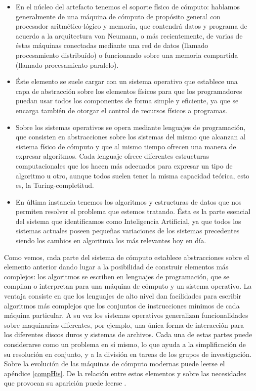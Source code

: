 \documentclass[12pt]{memoir}
\begin{document}
\begin{itemize}
	\item En el núcleo del artefacto tenemos el soporte físico de cómputo: hablamos generalmente de una máquina de cómputo de propósito general con procesador aritmético-lógico y memoria, que contendrá datos y programa de acuerdo a la arquitectura von Neumann, o más recientemente, de varias de éstas máquinas conectadas mediante una red de datos (llamado procesamiento distribuído) o funcionando sobre una memoria compartida (llamado procesamiento paralelo).
	\item Éste elemento se suele cargar con un sistema operativo que establece una capa de abstracción sobre los elementos físicos para que los programadores puedan usar todos los componentes de forma simple y eficiente, ya que se encarga también de otorgar el control de recursos físicos a programas.
	\item Sobre los sistemas operativos se opera mediante lenguajes de programación, que consisten en abstracciones sobre los sistemas del mismo que alcanzan al sistema físico de cómputo y que al mismo tiempo ofrecen una manera de expresar algoritmos. Cada lenguaje ofrece diferentes estructuras computacionales que los hacen más adecuados para expresar un tipo de algoritmo u otro, aunque todos suelen tener la misma capacidad teórica, esto es, la Turing-completitud.
	\item En última instancia tenemos los algoritmos y estructuras de datos que nos permiten resolver el problema que estemos tratando. Ésta es la parte esencial del sistema que identificamos como Inteligencia Artificial, ya que todos los sistemas actuales poseen pequeñas variaciones de los sistemas precedentes siendo los cambios en algoritmia los más relevantes hoy en día.
\end{itemize}

Como vemos, cada parte del sistema de cómputo establece abstracciones sobre el elemento anterior dando lugar a la posibilidad de construir elementos más complejos: los algoritmos se escriben en lenguajes de programación, que se compilan o interpretan para una máquina de cómputo y un sistema operativo. La ventaja consiste en que los lenguajes de alto nivel dan facilidades para escribir algoritmos más complejos que los conjuntos de instrucciones mínimos de cada máquina particular. A su vez los sistemas operativos generalizan funcionalidades sobre maquinarias diferentes, por ejemplo, una única forma de interacción para los diferentes discos duros y sistemas de archivos. Cada una de estas partes puede considerarse como un problema en sí mismo, lo que ayuda a la simplificación de su resolución en conjunto, y a la división en tareas de los grupos de investigación. Sobre la evolución de las máquinas de cómputo modernas puede leerse el apéndice \ref{compHis}. De la relación entre estos elementos y sobre las necesidades que provocan su aparición puede leerse \parencite{wiki:computerhistory}.
\end{document}
